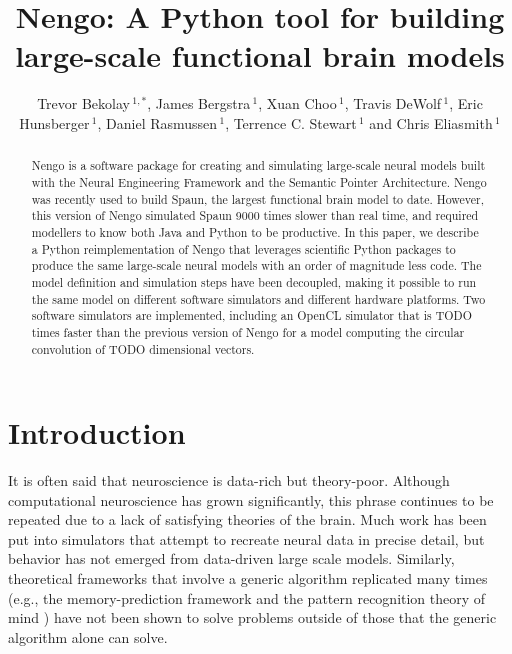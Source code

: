 \documentclass{frontiersSCNS}
\def\keyFont{\fontsize{8}{11}\helveticabold }
\def\firstAuthorLast{Bekolay {et~al.}}
\def\Authors{Trevor Bekolay\,$^{1,*}$, James Bergstra\,$^{1}$,
  Xuan Choo\,$^{1}$, Travis DeWolf\,$^{1}$, Eric Hunsberger\,$^{1}$,
  Daniel Rasmussen\,$^{1}$, Terrence C. Stewart\,$^{1}$
  and Chris Eliasmith\,$^{1}$}
\begin{document}
\onecolumn
{}

\title[Nengo in Python]{Nengo: A Python tool for
  building large-scale functional brain models}
\author[\firstAuthorLast ]{\Authors}
\address{}
\correspondance{}
\extraAuth{}

\maketitle


\begin{abstract}
  Nengo is a software package for creating and simulating
  large-scale neural models built with
  the Neural Engineering Framework
  and the Semantic Pointer Architecture.
  Nengo was recently used to build Spaun, the largest
  functional brain model to date.
  However, this version of Nengo simulated Spaun
  9000 times slower than real time,
  and required modellers to know
  both Java and Python to be productive.
  In this paper, we describe a Python reimplementation of Nengo
  that leverages scientific Python packages
  to produce the same large-scale neural models
  with an order of magnitude less code.
  The model definition and simulation steps
  have been decoupled,
  making it possible to run the same model
  on different software simulators
  and different hardware platforms.
  Two software simulators are implemented,
  including an OpenCL simulator
  that is TODO times faster than
  the previous version of Nengo
  for a model computing the circular convolution
  of TODO dimensional vectors.

  \tiny \keyFont{\section{Keywords:} 1 2 3 4 5 (6 7 8)}
\end{abstract}


\section{Introduction}

It is often said that neuroscience
is data-rich but theory-poor.
Although computational neuroscience
has grown significantly,
this phrase continues to be repeated
due to a lack of satisfying
theories of the brain.
Much work has been put into simulators
that attempt to recreate neural
data in precise detail,
but behavior has not emerged
from data-driven large scale models.
Similarly, theoretical frameworks
that involve a generic algorithm
replicated many times
(e.g., the memory-prediction framework \cite{TODO}
and the pattern recognition theory of mind \cite{TODO})
have not been shown to solve problems
outside of those that
the generic algorithm alone can solve.
\end{document}
